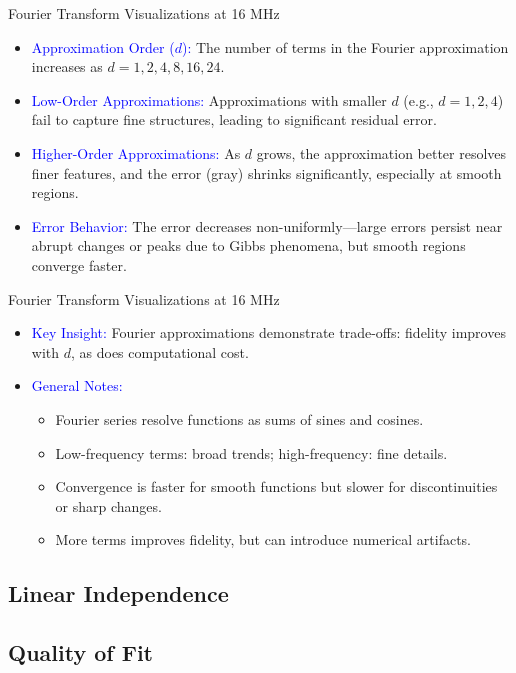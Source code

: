 \begin{frame}{Fourier Transform Visualizations at 16 MHz}
    \small
    \begin{itemize}
        \item \textcolor{blue}{Approximation Order (\(d\)):} 
              The number of terms in the Fourier approximation increases as \(d = 1, 2, 4, 8, 16, 24\).
        \item \textcolor{blue}{Low-Order Approximations:} 
              Approximations with smaller \(d\) (e.g., \(d = 1, 2, 4\)) fail to capture fine structures, leading to significant residual error.
        \item \textcolor{blue}{Higher-Order Approximations:} 
              As \(d\) grows, the approximation better resolves finer features, and the error (gray) shrinks significantly, especially at smooth regions.
        \item \textcolor{blue}{Error Behavior:} 
              The error decreases non-uniformly—large errors persist near abrupt changes or peaks due to Gibbs phenomena, but smooth regions converge faster.
    \end{itemize}
\end{frame}

\begin{frame}{Fourier Transform Visualizations at 16 MHz}
    \small
    \begin{itemize}
        \item \textcolor{blue}{Key Insight:} 
              Fourier approximations demonstrate trade-offs: fidelity improves with \(d\), as does computational cost.
        \item \textcolor{blue}{General Notes:}
              \begin{itemize}
                  \item Fourier series resolve functions as sums of sines and cosines.
                  \item Low-frequency terms: broad trends; high-frequency: fine details.
                  \item Convergence is faster for smooth functions but slower for discontinuities or sharp changes.
                  \item More terms improves fidelity, but can introduce numerical artifacts.
              \end{itemize}
    \end{itemize}
\end{frame}


\subsection{Linear Independence}
	
\subsection{Quality of Fit}

\endinput  %
